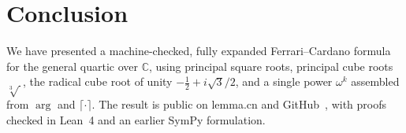 \documentclass[11pt,a4paper]{article}
\newcommand{\C}{\mathbb{C}}
\newcommand{\Arg}{\operatorname{arg}}
\begin{document}
\section{Conclusion}
\label{sec:conclusion}

We have presented a machine-checked, fully expanded Ferrari--Cardano formula for the general quartic over \(\C\), using principal square roots, principal cube roots \(\sqrt[3]{\,}\), the radical cube root of unity \(-\tfrac12+i\sqrt{3}/2\), and a single power \(\omega^{k}\) assembled from \(\Arg\) and \(\lceil\cdot\rceil\).
The result is public on lemma.cn and GitHub~\cite{lemma_repo}, with proofs checked in Lean~4 and an earlier SymPy formulation.



\end{document}
